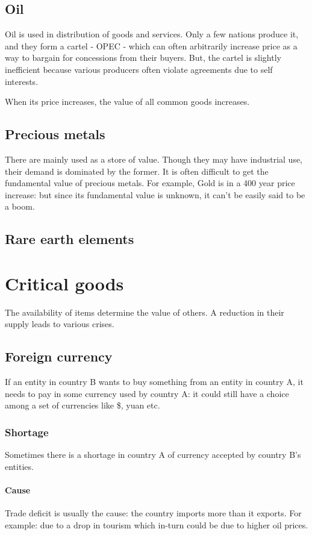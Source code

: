 \documentclass[oneside, article]{memoir}
\begin{document}
\section{Oil}
Oil is used in distribution of goods and services. Only a few nations produce it, and they form a cartel - OPEC - which can often arbitrarily increase price as a way to bargain for concessions from their buyers. But, the cartel is slightly inefficient because various producers often violate agreements due to self interests.

When its price increases, the value of all common goods increases.

\section{Precious metals}
There are mainly used as a store of value. Though they may have industrial use, their demand is dominated by the former. It is often difficult to get the fundamental value of precious metals. For example, Gold is in a 400 year price increase: but since its fundamental value is unknown, it can't be easily said to be a boom.

\section{Rare earth elements}
\tbc

\chapter{Critical goods}
The availability of items determine the value of others. A reduction in their supply leads to various crises.

\section{Foreign currency}
If an entity in country B wants to buy something from an entity in country A, it needs to pay in some currency used by country A: it could still have a choice among a set of currencies like \$, yuan etc.

\subsection{Shortage}
Sometimes there is a shortage in country A of currency accepted by country B's entities.

\subsubsection{Cause}
Trade deficit is usually the cause: the country imports more than it exports. For example: due to a drop in tourism which in-turn could be due to higher oil prices. 
\end{document}
